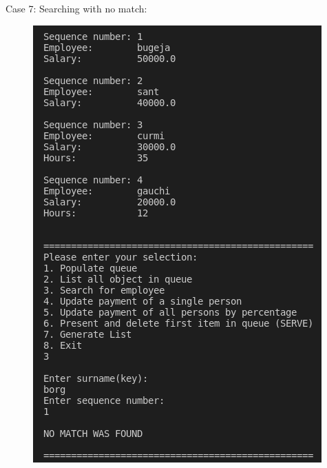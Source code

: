 \documentclass[12pt]{article}
\begin{document}
Case 7: Searching with no match:
\begin{figure}[h]
\centering
\includegraphics[scale=0.30]{Images/Testing 3/6.png}
\end{figure}
\end{document}
